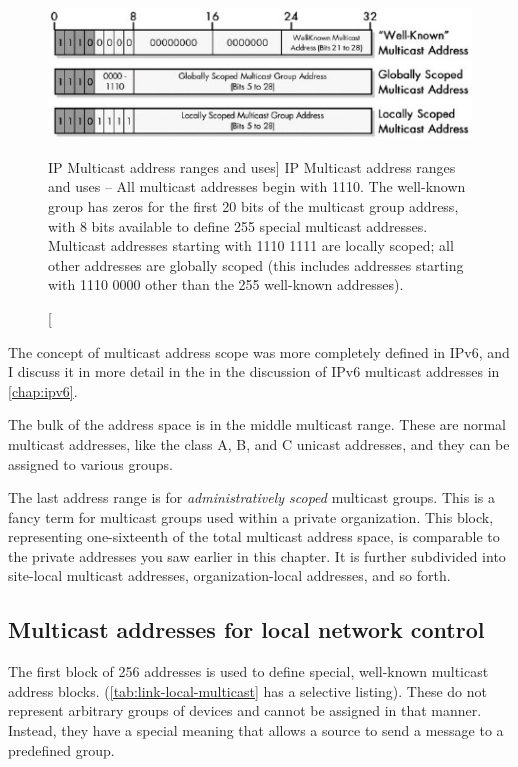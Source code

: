 \begin{figure}
   \centering
   \includegraphics[width=.7\textwidth]{images/ip-multicast-ranges.jpg}
   \caption
      [IP Multicast address ranges and uses]
      {
         IP Multicast address ranges and uses -- All multicast addresses begin with 1110.
         The well-known group has zeros for the first 20 bits of the multicast group address, with 8 bits available to define 255 special multicast addresses.
         Multicast addresses starting with 1110 1111 are locally scoped; all other addresses are globally scoped
         (this includes addresses starting with 1110 0000 other than the 255 well-known addresses).
      }
   \label{fig:ip-multicast-ranges}
\end{figure}

\begin{note}
The concept of multicast address scope was more completely defined in IPv6,
and I discuss it in more detail in the in the discussion of IPv6 multicast addresses in \vref{chap:ipv6}.
\end{note}

The bulk of the address space is in the middle multicast range. These
are normal multicast addresses, like the class A, B, and C unicast
addresses, and they can be assigned to various groups.

The last address range is for \emph{administratively scoped} multicast
groups. This is a fancy term for multicast groups used within a private
organization. This block, representing one-sixteenth of the total
multicast address space, is comparable to the private addresses you saw
earlier in this chapter. It is further subdivided into site-local
multicast addresses, organization-local addresses, and so
forth.



\subsection{Multicast addresses for local network control}

The first block of 256 addresses is used to define special, well-known multicast address blocks.
(\cref{tab:link-local-multicast} has a selective listing).
These do not represent arbitrary groups of devices and cannot be assigned in that manner.
Instead, they have a special meaning that allows a source to send a message to a predefined group.


